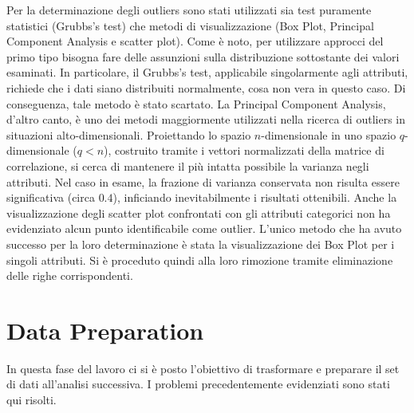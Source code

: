 \documentclass[a4paper,9pt]{article}
\begin{document}
Per la determinazione degli outliers sono stati utilizzati sia test puramente statistici (Grubbs's test) che metodi di visualizzazione (Box Plot, Principal Component Analysis e scatter plot). Come è noto, per utilizzare approcci del primo tipo bisogna fare delle assunzioni sulla distribuzione sottostante dei valori esaminati. In particolare, il Grubbs's test, applicabile singolarmente agli attributi, richiede che i dati siano distribuiti normalmente, cosa non vera in questo caso. Di conseguenza, tale metodo è stato scartato. 
La Principal Component Analysis, d'altro canto, è uno dei metodi maggiormente utilizzati nella ricerca di outliers in situazioni alto-dimensionali. Proiettando lo spazio $n$-dimensionale in uno spazio $q$-dimensionale ($q<n$), costruito tramite i vettori normalizzati della matrice di correlazione, si cerca di mantenere il più intatta possibile la varianza negli attributi. Nel caso in esame, la frazione di varianza conservata non risulta essere significativa (circa $0.4$), inficiando inevitabilmente i risultati ottenibili.
Anche la visualizzazione degli scatter plot confrontati con gli attributi categorici non ha evidenziato alcun punto identificabile come outlier.
L'unico metodo che ha avuto successo per la loro determinazione è stata la visualizzazione dei Box Plot per i singoli attributi. Si è proceduto quindi alla loro rimozione tramite eliminazione delle righe corrispondenti.

\section{Data Preparation}
In questa fase del lavoro ci si è posto l'obiettivo di trasformare e preparare il set di dati all'analisi successiva. I problemi precedentemente evidenziati sono stati qui risolti.\\
\end{document}
